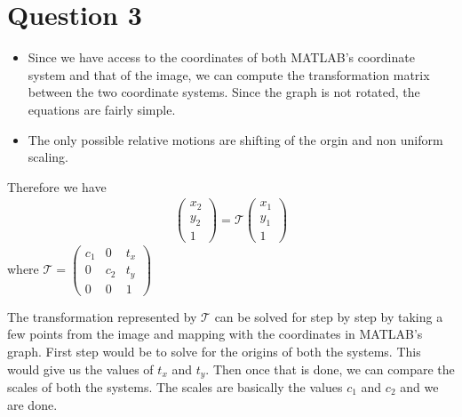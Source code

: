 \documentclass[12pt]{article}
\begin{document}
\section*{Question 3}
    \begin{itemize}
        \item Since we have access to the coordinates of both MATLAB's coordinate system and that of the image, we can compute the 
        transformation matrix between the two coordinate systems. Since the graph is not rotated, the equations are fairly 
        simple.
        \item The only possible relative motions are shifting of the orgin and non uniform scaling.
    \end{itemize}

    Therefore we have 
    \begin{align}
        \begin{pmatrix}
            x_{2} \\
            y_{2} \\
            1
        \end{pmatrix}
        = \mathcal{T} 
        \begin{pmatrix}
            x_{1} \\
            y_{1} \\
            1
        \end{pmatrix}
    \end{align}
    where $\mathcal{T} = \begin{pmatrix}
                            c_{1} & 0 & t_{x} \\
                            0  & c_{2} & t_{y} \\
                            0 & 0 & 1
                        \end{pmatrix}$

    The transformation represented by $\mathcal{T}$ can be solved for step by step by taking a few points from the image 
    and mapping with the coordinates in MATLAB's graph. First step would be to solve for the origins of both the systems.
    This would give us the values of $t_{x}$ and $t_{y}$. Then once that is done, we can compare the scales of both 
    the systems. The scales are basically the values $c_{1}$ and $c_{2}$ and we are done.
\clearpage
\end{document}
